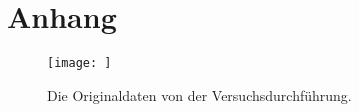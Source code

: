 \section{Anhang}
\label{sec:anhang}

\begin{figure}
    \centering
    \texttt{[image: ]}
    \caption{Die Originaldaten von der Versuchsdurchführung.}
    \label{fig:originaldaten}
\end{figure}
